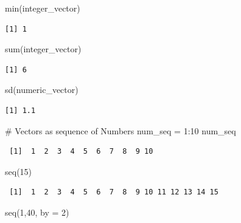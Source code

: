 \documentclass[
  letterpaper,
  DIV=11,
  numbers=noendperiod]{scrreprt}
\newenvironment{Shaded}{\begin{snugshade}}{\end{snugshade}}
\newcommand{\AttributeTok}[1]{\textcolor[rgb]{0.40,0.45,0.13}{#1}}
\newcommand{\CommentTok}[1]{\textcolor[rgb]{0.37,0.37,0.37}{#1}}
\newcommand{\DecValTok}[1]{\textcolor[rgb]{0.68,0.00,0.00}{#1}}
\newcommand{\FunctionTok}[1]{\textcolor[rgb]{0.28,0.35,0.67}{#1}}
\newcommand{\NormalTok}[1]{\textcolor[rgb]{0.00,0.23,0.31}{#1}}
\newcommand{\OtherTok}[1]{\textcolor[rgb]{0.00,0.23,0.31}{#1}}
\newcommand{\SpecialCharTok}[1]{\textcolor[rgb]{0.37,0.37,0.37}{#1}}
\begin{document}
\begin{Shaded}
\begin{Highlighting}[]
\FunctionTok{min}\NormalTok{(integer\_vector)}
\end{Highlighting}
\end{Shaded}

\begin{verbatim}
[1] 1
\end{verbatim}

\begin{Shaded}
\begin{Highlighting}[]
\FunctionTok{sum}\NormalTok{(integer\_vector)}
\end{Highlighting}
\end{Shaded}

\begin{verbatim}
[1] 6
\end{verbatim}

\begin{Shaded}
\begin{Highlighting}[]
\FunctionTok{sd}\NormalTok{(numeric\_vector)}
\end{Highlighting}
\end{Shaded}

\begin{verbatim}
[1] 1.1
\end{verbatim}

\begin{Shaded}
\begin{Highlighting}[]
\CommentTok{\# Vectors as sequence of Numbers }
\NormalTok{num\_seq }\OtherTok{=} \DecValTok{1}\SpecialCharTok{:}\DecValTok{10}
\NormalTok{num\_seq}
\end{Highlighting}
\end{Shaded}

\begin{verbatim}
 [1]  1  2  3  4  5  6  7  8  9 10
\end{verbatim}

\begin{Shaded}
\begin{Highlighting}[]
\FunctionTok{seq}\NormalTok{(}\DecValTok{15}\NormalTok{)}
\end{Highlighting}
\end{Shaded}

\begin{verbatim}
 [1]  1  2  3  4  5  6  7  8  9 10 11 12 13 14 15
\end{verbatim}

\begin{Shaded}
\begin{Highlighting}[]
\FunctionTok{seq}\NormalTok{(}\DecValTok{1}\NormalTok{,}\DecValTok{40}\NormalTok{, }\AttributeTok{by =} \DecValTok{2}\NormalTok{)}
\end{Highlighting}
\end{Shaded}
\end{document}
